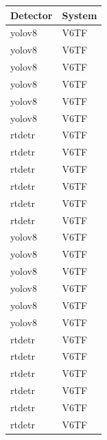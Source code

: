 \begin{tabular}{ll}
\toprule
Detector & System &  \\
\midrule
yolov8 & V6TF &  \\
yolov8 & V6TF &  \\
yolov8 & V6TF &  \\
yolov8 & V6TF &  \\
yolov8 & V6TF &  \\
yolov8 & V6TF &  \\
rtdetr & V6TF &  \\
rtdetr & V6TF &  \\
rtdetr & V6TF &  \\
rtdetr & V6TF &  \\
rtdetr & V6TF &  \\
rtdetr & V6TF &  \\
yolov8 & V6TF &  \\
yolov8 & V6TF &  \\
yolov8 & V6TF &  \\
yolov8 & V6TF &  \\
yolov8 & V6TF &  \\
yolov8 & V6TF &  \\
rtdetr & V6TF &  \\
rtdetr & V6TF &  \\
rtdetr & V6TF &  \\
rtdetr & V6TF &  \\
rtdetr & V6TF &  \\
rtdetr & V6TF &  \\
\bottomrule
\end{tabular}
